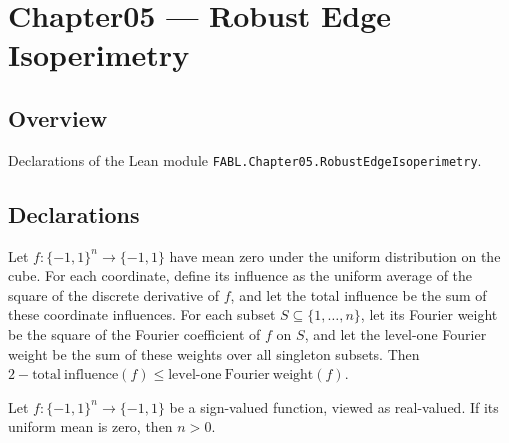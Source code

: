 \chapter{Chapter05 — Robust Edge Isoperimetry}
\section{Overview}

Declarations of the Lean module \texttt{FABL.Chapter05.RobustEdgeIsoperimetry}.

\section{Declarations}

\begin{theorem}
\label{FABL.two_sub_totalInfluence_le_fourierWeightAtLevel_one_of_isBalanced}
\leanok
{}
Let $f:\{-1,1\}^n\to\{-1,1\}$ have mean zero under the uniform distribution on the cube.
For each coordinate, define its influence as the uniform average of the square of the
discrete derivative of $f$, and let the total influence be the sum of these coordinate
influences. For each subset $S\subseteq\{1,\ldots,n\}$, let its Fourier weight be the
square of the Fourier coefficient of $f$ on $S$, and let the level-one Fourier weight be
the sum of these weights over all singleton subsets. Then $2-\mathrm{total\
influence}(f)\le \mathrm{level\text{-}one\ Fourier\ weight}(f)$.
\end{theorem}

\begin{theorem}
\label{FABL.positive_dimension_of_isBalanced}
\leanok
{}
\difficulty{4}
Let $f:\{-1,1\}^n\to\{-1,1\}$ be a sign-valued function, viewed as real-valued. If its
uniform mean is zero, then $n>0$.
\end{theorem}

